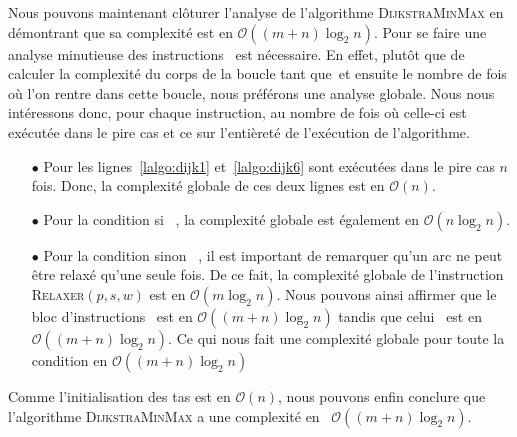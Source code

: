 Nous pouvons maintenant clôturer l'analyse de l'algorithme \textsc{DijkstraMinMax} en démontrant que sa complexité est en $\mathcal{O}((m+n)\log_2 n)$. Pour se faire une analyse minutieuse des instructions~ est nécessaire. En effet, plutôt que de calculer la complexité du corps de la boucle \og tant que\fg~et ensuite le nombre de fois où l'on rentre dans cette boucle, nous préférons une analyse globale. Nous nous intéressons donc, pour chaque instruction, au nombre de fois où celle-ci est exécutée dans le pire cas et ce sur l'entièreté de l'exécution de l'algorithme.

\begin{itemize}
	\item[$\bullet$] Pour les lignes~\ref{lalgo:dijk1} et~\ref{lalgo:dijk6} sont exécutées dans le pire cas $n$ fois. Donc, la complexité globale de ces deux lignes est en $\mathcal{O}(n)$.
	\item[$\bullet$] Pour la condition \og si \fg~, la complexité globale est également en   	 $\mathcal{O}(n \log_2 n)$.
	
	\item[$\bullet$] Pour la condition \og sinon \fg~, il est important de remarquer qu'un arc ne peut être relaxé qu'une seule fois. De ce fait, la complexité globale de l'instruction \textsc{Relaxer}$(p,s,w)$ est en $\mathcal{O}(m \log_2 n)$. Nous pouvons ainsi affirmer que le bloc d'instructions~ est en $\mathcal{O}((m+n) \log_2 n)$ tandis que celui~ est en $\mathcal{O}((m+n) \log_2 n)$. Ce qui nous fait une complexité globale pour toute la condition en $\mathcal{O}((m+n) \log_2 n)$
	
\end{itemize}

Comme l'initialisation des tas est en $\mathcal{O}(n)$, nous pouvons enfin conclure que l'algorithme \textsc{DijkstraMinMax} a une complexité en \mbox{ $\!\mathcal{O}((m\!+\! n) \log_2 n)$}.
	


 